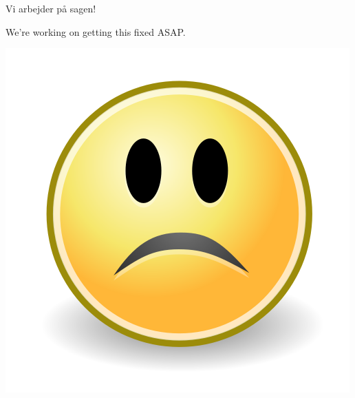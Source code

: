 \documentclass{article}
\begin{document}
\maketitle

\null
\vspace{-1cm}

\begin{center}

\vspace{-1cm}


\vspace{-0.8cm}

\huge

Vi arbejder på sagen!

\english


\vspace{-1cm}

We're working on getting this fixed ASAP.

\vspace{0.3cm}

\includegraphics[scale=0.2]{billeder/500pxSadWikiCommons.png}

\end{center}

\dansk

\underskriv
\end{document}
